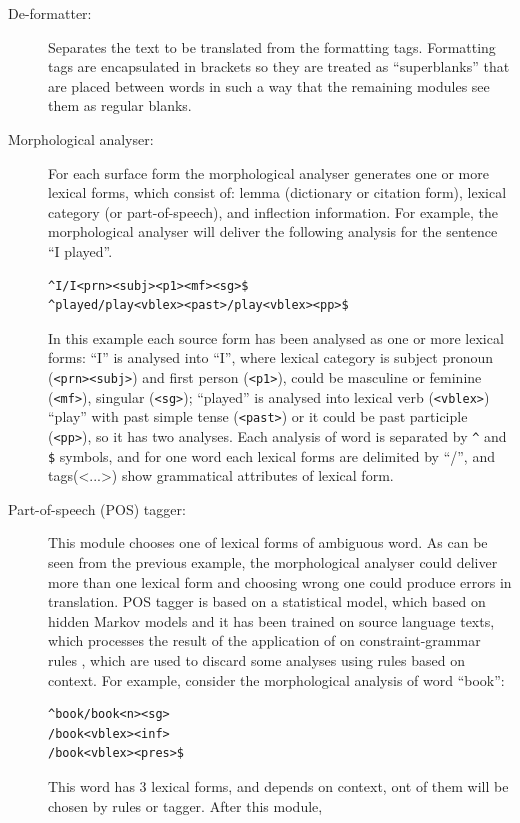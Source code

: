 \documentclass[11pt]{article}
\begin{document}
\begin{description}
\item[De-formatter:] Separates the text to be translated from the formatting tags.  Formatting tags are 
  encapsulated in brackets so they are treated as ``superblanks'' that are placed between words in 
  such a way that the remaining modules see them as regular blanks.  
\item[Morphological analyser:] For each surface form the morphological analyser generates one or more 
  lexical forms, which consist of: lemma (dictionary or citation form), lexical category (or part-of-speech), 
  and inflection information. For example, the morphological analyser will deliver the following analysis for 
  the sentence ``I played''.
\begin{verbatim}
^I/I<prn><subj><p1><mf><sg>$ 
^played/play<vblex><past>/play<vblex><pp>$
\end{verbatim}
  In this example each source form has been analysed as one or more lexical forms: ``I'' is analysed 
  into ``I'', where lexical category is subject pronoun (\texttt{<prn><subj>}) and first person (\texttt{<p1>}), could be 
  masculine or feminine (\texttt{<mf>}), singular (\texttt{<sg>}); ``played'' is analysed into lexical verb (\texttt{<vblex>}) 
  ``play'' with past simple tense (\texttt{<past>}) or it could be past participle (\texttt{<pp>}), so it has two 
  analyses. Each analysis of word is separated by \texttt{\^{}} and \texttt{\$} symbols, and for one word each lexical 
  forms are delimited by ``/'', and tags(<...>) show grammatical attributes of lexical form. 
\item[Part-of-speech (POS) tagger:] This module chooses one of lexical forms of ambiguous word. As can be 
  seen from the previous example, the morphological analyser could deliver more than one lexical form and 
  choosing wrong one could produce errors in translation. POS tagger is based on a statistical model, which 
  based on hidden Markov models and it has been trained on source language texts, which processes the 
  result of the application of  on constraint-grammar rules \citep{karlsson95}, which are used to discard some 
  analyses using rules based on context. For example, consider the morphological analysis of word ``book'':
\begin{verbatim}
^book/book<n><sg>
/book<vblex><inf>
/book<vblex><pres>$
\end{verbatim}
  This word has 3 lexical forms, and depends on context, ont of them will be chosen by rules or tagger. After  this module, 

\end{description}
\end{document}

